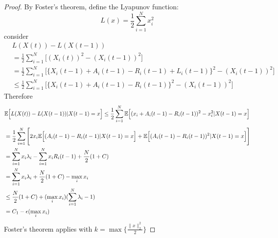 \documentclass[a4paper,10pt,english]{article}
\begin{document}
\begin{proof}
By Foster's theorem, define the Lyapunov function:
\[L(x) = \frac{1}{2} \sum_{i=1}^{N}x_i^2\] consider
\begin{align*}
& L(X(t)) - L(X(t-1))\\
&= \frac{1}{2} \sum_{i=1}^{N}\Big[ (X_i(t))^2 - (X_i(t-1))^2 \Big]\\
&= \frac{1}{2} \sum_{i=1}^{N}\Big[ \{X_i(t-1) + A_i(t-1) - R_i(t-1) + L_i(t-1)\}^2 - (X_i(t-1))^2 \Big]\\
& \leq \frac{1}{2} \sum_{i=1}^{N}\Big[ \{X_i(t-1) + A_i(t-1) - R_i(t-1)\}^2 - (X_i(t-1))^2 \Big]
\end{align*}
Therefore 
\[\mathbb{E}\Big[ L(X(t)) - L(X(t-1)) | X(t-1) = x \Big]  \leq \frac{1}{2} \sum_{i=1}^{N} \mathbb{E} \Big[ (x_i + A_i(t-1) - R_i(t-1))^2 - x_i^2 | X(t-1) = x \Big]\]
\begin{align*}
&= \frac{1}{2} \sum_{i=1}^{N} \Bigg[ 2x_i \mathbb{E} \Big[ (A_i(t-1) - R_i(t-1)| X(t-1) = x \Big] + \mathbb{E} \Big[ (A_i(t-1) - R_i(t-1))^2 | X(t-1) = x \Big] \Bigg]\\
&= \sum_{i=1}^{N}x_i \lambda _i - \sum_{i=1}^{N}x_i R_i(t-1) + \frac{N}{2}(1+C)\\
&= \sum_{i=1}^{N}x_i \lambda _i + \frac{N}{2}(1+C) - \max _i x_i\\
& \leq \frac{N}{2}(1+C) + (\max _i x_i)(\sum_{i=1}^{N} \lambda _i - 1)\\
&= C_1 - \epsilon (\max _i x_i)
\end{align*}
Foster's theorem applies with $k = \max \{\frac{\|x\|_2 ^2}{2}\}$
\end{proof}
\end{document}
